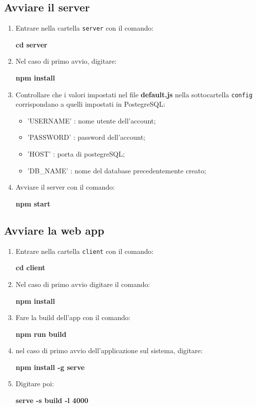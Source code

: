 \subsection{Avviare il server}
\begin{enumerate}[label=\textbf{\arabic*})]
\item Entrare nella cartella \texttt{server} con il comando:
	\begin{center}
			\textcolor{coloreRosso}{\textbf{cd server}}
 	\end{center}
\item Nel caso di primo avvio, digitare:
	\begin{center}
			\textcolor{coloreRosso}{\textbf{npm install}}
 	\end{center}
\item Controllare che i valori impostati nel file \textbf{default.js} nella sottocartella \texttt{config} corrispondano a quelli impostati in PostegreSQL:
\begin{itemize}
\item 'USER\underline{}NAME' : nome utente dell'account;
\item 'PASSWORD' : password dell'account;
\item 'HOST' : porta di postegreSQL;
\item 'DB\_NAME' : nome del database precedentemente creato;
\end{itemize}
\item Avviare il server con il comando:
	\begin{center}
			\textcolor{coloreRosso}{\textbf{npm start}}
 	\end{center}
\end{enumerate}
\subsection{Avviare la web app}
\begin{enumerate}[label=\textbf{\arabic*})]
\item Entrare nella cartella \texttt{client} con il comando:
	\begin{center}
			\textcolor{coloreRosso}{\textbf{cd client}}
 	\end{center}
\item Nel caso di primo avvio digitare il comando:
		\begin{center}
			\textcolor{coloreRosso}{\textbf{npm install}}
 		\end{center}
\item Fare la build dell'app con il comando:
		\begin{center}
			\textcolor{coloreRosso}{\textbf{npm run build}}
 		\end{center}
\item nel caso di primo avvio dell'applicazione sul sistema, digitare:
		\begin{center}
			\textcolor{coloreRosso}{\textbf{npm install -g serve}}
 		\end{center}	     
\item Digitare poi:
		\begin{center}
			\textcolor{coloreRosso}{\textbf{serve -s build -l 4000}}
 		\end{center}		
\end{enumerate}


